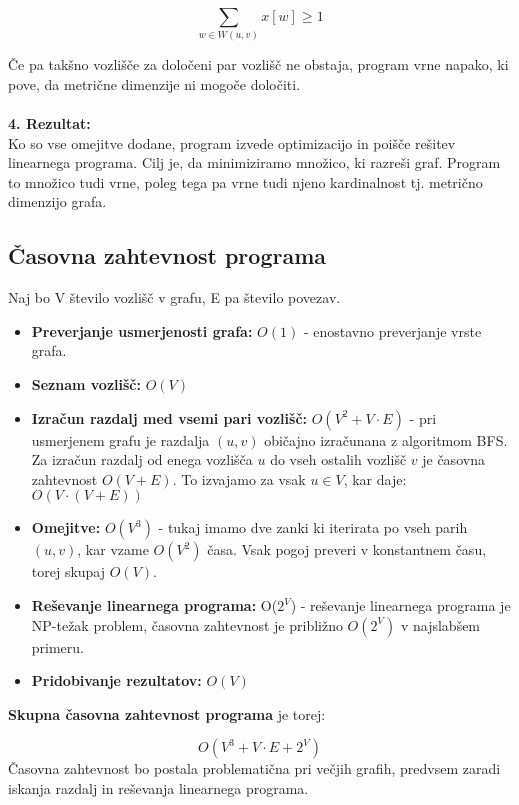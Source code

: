 \documentclass[a4paper,12pt]{article}
\theoremstyle{definition}
\theoremstyle{remark}
\theoremstyle{definition}
\begin{document}
\[
\sum_{w \in W(u, v)} x[w] \geq 1
\]

\noindent
Če pa takšno vozlišče za določeni par vozlišč ne obstaja, program vrne napako, ki pove, da metrične dimenzije ni mogoče določiti.
\\
\\
\noindent
\textbf{4. Rezultat:}\\
Ko so vse omejitve dodane, program izvede optimizacijo in poišče rešitev linearnega programa. 
Cilj je, da minimiziramo množico, ki razreši graf. Program to množico tudi vrne, poleg tega pa vrne tudi njeno kardinalnost tj. metrično dimenzijo grafa.



\subsection*{Časovna zahtevnost programa}

Naj bo V število vozlišč v grafu, E pa število povezav.
\begin{itemize}
    \item \textbf{Preverjanje usmerjenosti grafa:} $O(1)$ - enostavno preverjanje vrste grafa.
    \item \textbf{Seznam vozlišč:} $O(V)$ 
    \item \textbf{Izračun razdalj med vsemi pari vozlišč:} $O(V^2 + V \cdot E)$ - pri usmerjenem grafu je razdalja $(u,v)$ običajno izračunana z algoritmom BFS.
    Za izračun razdalj od enega vozlišča $u$ do vseh ostalih vozlišč $v$ je časovna zahtevnost $O(V+E)$.
    To izvajamo za vsak $u \in V$, kar daje: $O(V\cdot(V+E))$
    \item \textbf{Omejitve:} $O(V^3)$ - tukaj imamo dve zanki ki iterirata po vseh parih $(u, v)$, kar vzame $O(V^2)$ časa. 
    Vsak pogoj preveri v konstantnem času, torej skupaj $O(V)$.
    \item \textbf{Reševanje linearnega programa:} O($2^V$) - reševanje linearnega programa je NP-težak problem, časovna zahtevnost je približno $O(2^V)$ 
    v najslabšem primeru.
    \item \textbf{Pridobivanje rezultatov:} $O(V)$
\end{itemize}

\noindent
\textbf{Skupna časovna zahtevnost programa} je torej:

\[
O(V^3 + V \cdot E + 2^V)
\]
\noindent
Časovna zahtevnost bo postala problematična pri večjih grafih, predvsem zaradi iskanja razdalj in reševanja linearnega programa.
\end{document}
